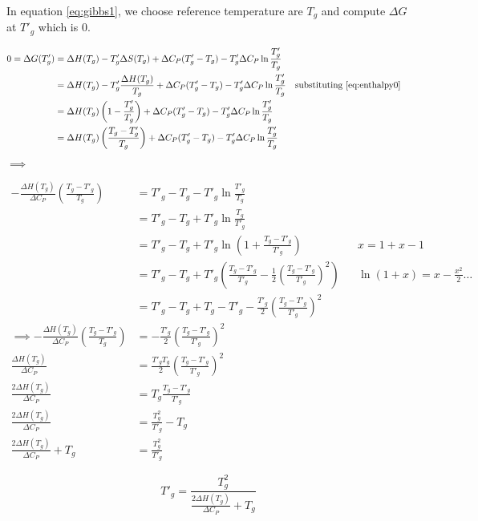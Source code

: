 \documentclass[]{article}
\begin{document}
In equation \ref{eq:gibbs1}, we choose reference temperature are $T_g$
and compute $\Delta G$ at $T'_g$ which is 0.

\begin{align}
    0 = \Delta G(T'_g) &= \Delta H(T_g) - T'_g \Delta S(T_g) + \Delta C_P (T'_g -
        T_g) - T'_g \Delta C_P \ln{\frac{T'_g}{T_g}}  \\
        &= \Delta H(T_g) - T'_g \frac{\Delta H(T_g)}{T_g} + \Delta C_P (T'_g -
        T_g) - T'_g \Delta C_P \ln{\frac{T'_g}{T_g}} && \mbox{substituting
    \ref{eq:enthalpy0}}  \\
    &= \Delta H(T_g) \left(1 - \frac{T'_g}{T_g} \right) + \Delta C_P (T'_g -
        T_g) - T'_g \Delta C_P \ln{\frac{T'_g}{T_g}} \\
    &= \Delta H(T_g) \left(\frac{T_g - T'_g}{T_g} \right) + \Delta C_P (T'_g -
        T_g) - T'_g \Delta C_P \ln{\frac{T'_g}{T_g}} \\
\end{align}

$\implies$

\begin{align}
    - \frac{\Delta H(T_g)}{\Delta C_P} \left(\frac{T_g - T'_g}{T_g} \right) 
    &= T'_g - T_g - T'_g \ln{\frac{T'_g}{T_g}} \\
    &= T'_g - T_g + T'_g \ln{\frac{T_g}{T'_g}} \\
    &= T'_g - T_g + T'_g \ln\left(1+{\frac{T_g - T'_g}{T'_g}}\right) && \mbox{$x = 1 + x - 1$} \\
    &= T'_g - T_g + T'_g \left({\frac{T_g - T'_g}{T'_g}} - \frac{1}{2}\left(
    \frac{T_g - T'_g}{T'_g} \right)^2 \right) && \mbox{$\ln(1+x) = x -
\frac{x^2}{2} \ldots $} \\
&= T'_g - T_g + T_g - T'_g - \frac{T'_g}{2} \left( \frac{T_g - T'_g}{T'_g}
\right)^2  \\
\implies  - \frac{\Delta H(T_g)}{\Delta C_P} \left(\frac{T_g - T'_g}{T_g} \right)
    &= - \frac{T'_g}{2} \left( \frac{T_g - T'_g}{T'_g} \right)^2 \\
 \frac{\Delta H(T_g)}{\Delta C_P} &=  \frac{T'_gT_g}{2} \left( \frac{T_g - T'_g}{T'_g} \right)^2 \\ 
 \frac{2\Delta H(T_g)}{\Delta C_P} &=  T_g \frac{T_g - T'_g}{T'_g} \\ 
\frac{2\Delta H(T_g)}{\Delta C_P} &=   \frac{T_g^2}{T'_g} - T_g \\ 
\frac{2\Delta H(T_g)}{\Delta C_P} + T_g &=   \frac{T_g^2}{T'_g}  
\end{align}

\begin{equation}
    \boxed{T'_g = \frac{T_g^2}{\frac{2\Delta H(T_g)}{\Delta C_P} + T_g}}
\end{equation}
\end{document}
